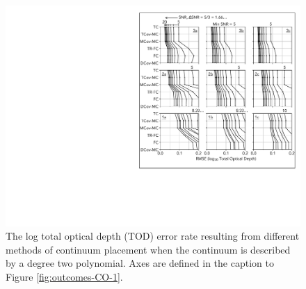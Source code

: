 \documentclass[trackchanges]{aastex62}
\begin{document}
{\begin{figure}
  \includegraphics[width=\linewidth]{figures/annotated_co2_RMSEs_vs_SNR.pdf}
  \caption{
  The log total optical depth (TOD) error rate resulting from different methods of continuum placement when the continuum is described by a degree two polynomial.
  Axes are defined in the caption to Figure \ref{fig:outcomes-CO-1}.
  }
  \label{fig:outcomes-CO-2}
\end{figure}

}
\end{document}
